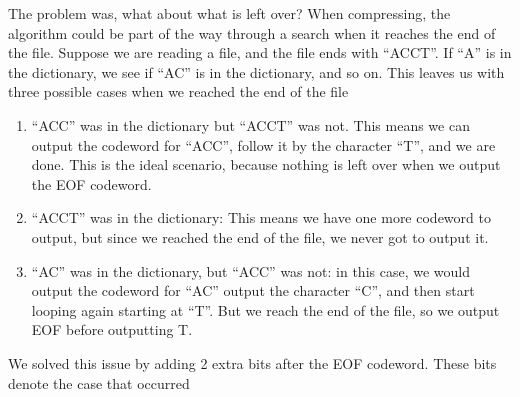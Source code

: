 \documentclass[12pt,twoside]{reedthesis}
\providecommand{\tightlist}{%
  \setlength{\itemsep}{0pt}\setlength{\parskip}{0pt}}
\begin{document}
The problem was, what about what is left over? When compressing, the algorithm could be part of the way through a search when it reaches the end of the file. Suppose we are reading a file, and the file ends with ``ACCT''. If ``A'' is in the dictionary, we see if ``AC'' is in the dictionary, and so on. This leaves us with three possible cases when we reached the end of the file
\begin{enumerate}
\def\labelenumi{\arabic{enumi}.}
\tightlist
\item
  ``ACC'' was in the dictionary but ``ACCT'' was not. This means we can output the codeword for ``ACC'', follow it by the character ``T'', and we are done. This is the ideal scenario, because nothing is left over when we output the EOF codeword.
\item
  ``ACCT'' was in the dictionary: This means we have one more codeword to output, but since we reached the end of the file, we never got to output it.
\item
  ``AC'' was in the dictionary, but ``ACC'' was not: in this case, we would output the codeword for ``AC'' output the character ``C'', and then start looping again starting at ``T''. But we reach the end of the file, so we output EOF before outputting T.
\end{enumerate}
We solved this issue by adding 2 extra bits after the EOF codeword. These bits denote the case that occurred
\end{document}
